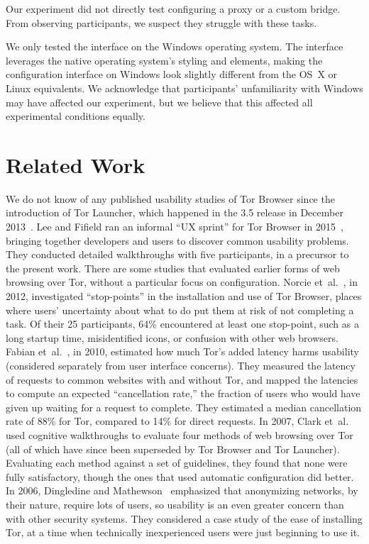 \documentclass[USenglish,oneside,twocolumn]{article}
\begin{document}
Our experiment did not directly test configuring a proxy or a custom bridge. From observing participants, we suspect they struggle with these tasks. 

We only tested the interface on the Windows operating system. The interface leverages the native operating system's styling and elements, making the configuration interface on Windows look slightly different from the OS~X or Linux equivalents. We acknowledge that participants' unfamiliarity with Windows may have affected our experiment, but we believe that this affected all experimental conditions equally.  

\section{Related Work}
\label{sec:related} 

We do not know of any published usability studies of Tor Browser
since the introduction of Tor Launcher,
which happened in the 3.5 release in December 2013~\cite{torbrowser-35}.
Lee and Fifield ran an informal ``UX sprint''
for Tor Browser in 2015~\cite{uxsprint}, bringing together developers and users
to discover common usability problems.
They conducted detailed walkthroughs with five participants,
in a precursor to the present work.
There are some studies that evaluated earlier forms of web browsing over Tor,
without a particular focus on configuration.
Norcie et~al.~\cite{norcie2012eliminating}, in 2012,
investigated ``stop-points''
in the installation and use of Tor Browser,
places where users' uncertainty about what to do
put them at risk of not completing a task.
Of their 25 participants, 64\% encountered at least one stop-point,
such as a long startup time, misidentified icons, or confusion with other web browsers.
Fabian et~al.~\cite{fabian2010privately}, in 2010,
estimated how much Tor's added latency harms usability
(considered separately from user interface concerns).
They measured the latency of requests to common websites with and without Tor,
and mapped the latencies to compute an expected ``cancellation rate,''
the fraction of users who would have given up waiting for a request to complete.
They estimated a median cancellation rate of 88\% for Tor, compared to 14\% for direct requests.
In 2007, Clark et~al.~\cite{clark2007usability}
used cognitive walkthroughs to evaluate four
methods of web browsing over Tor
(all of which have since been superseded by Tor Browser and Tor Launcher).
Evaluating each method against a set of guidelines,
they found that none were fully satisfactory,
though the ones that used automatic configuration did better.
In 2006, Dingledine and Mathewson~\cite{dingledine2006anonymity}
emphasized that anonymizing networks, by their nature,
require lots of users, so usability is an even greater concern
than with other security systems.
They considered a case study of the ease of installing Tor,
at a time when technically inexperienced users were just beginning to use it.
\end{document}

